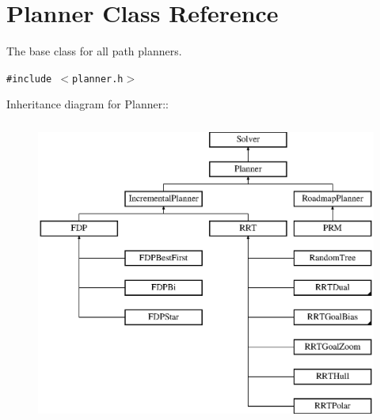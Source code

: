 \section{Planner  Class Reference}
\label{classPlanner}
The base class for all path planners. 


{\tt \#include $<$planner.h$>$}

Inheritance diagram for Planner::\begin{figure}[H]
\begin{center}
\leavevmode
\includegraphics[height=10cm]{classPlanner}
\end{center}
\end{figure}

